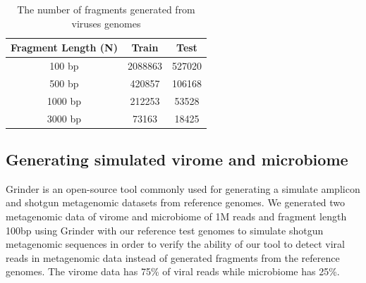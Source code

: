 \documentclass[conference]{IEEEtran}
\begin{document}
\begin{table}[h!]
	\centering
	\begin{tabular}{||c c c||} 
		Fragment Length (N) & Train & Test \\ [0.5ex] 
		\hline\hline
		100 bp & 2088863  & 527020  \\ 
		500 bp & 420857  & 106168  \\
		1000 bp & 212253  & 53528  \\
		3000 bp & 73163  & 18425  \\ [1ex] 
	\end{tabular}
	\caption{The number of fragments generated from viruses genomes}
	\label{table:fragments_stats}
\end{table}

\subsection{Generating simulated virome and microbiome}
Grinder \cite{angly2012grinder} is an open-source tool commonly used for generating a simulate amplicon and shotgun metagenomic datasets from reference genomes. 
We generated two metagenomic data of virome and microbiome of 1M reads and fragment length 100bp using Grinder with our reference test genomes to simulate shotgun metagenomic sequences in order to verify the ability of our tool to detect viral reads in metagenomic data instead of generated fragments from the reference genomes. The virome data has 75\% of viral reads while microbiome has 25\%. %

\end{document}
